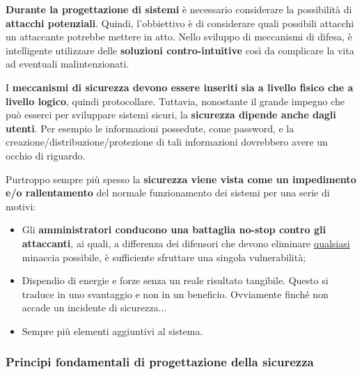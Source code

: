\documentclass[a4paper]{article}
\begin{document}
	\noindent
	\textbf{Durante la progettazione di sistemi} è necessario considerare la possibilità di \textbf{attacchi potenziali}. Quindi, l'obbiettivo è di considerare quali possibili attacchi un attaccante potrebbe mettere in atto. Nello sviluppo di meccanismi di difesa, è intelligente utilizzare delle \textbf{soluzioni contro-intuitive} così da complicare la vita ad eventuali malintenzionati.\newline
	
	\noindent
	I \textbf{meccanismi di sicurezza devono essere inseriti sia a livello fisico che a livello logico}, quindi protocollare. Tuttavia, nonostante il grande impegno che può esserci per sviluppare sistemi sicuri, la \textbf{sicurezza dipende anche dagli utenti}. Per esempio le informazioni possedute, come password, e la creazione/distribuzione/protezione di tali informazioni dovrebbero avere un occhio di riguardo.\newline
	
	\noindent
	Purtroppo sempre più spesso la \textbf{sicurezza viene vista come un impedimento e/o rallentamento} del normale funzionamento dei sistemi per una serie di motivi:
	\begin{itemize}
		\item Gli \textbf{amministratori conducono una battaglia no-stop contro gli attaccanti}, ai quali, a differenza dei difensori che devono eliminare \underline{qualsiasi} minaccia possibile, è sufficiente sfruttare una singola vulnerabilità;
		
		\item Dispendio di energie e forze senza un reale risultato tangibile. Questo si traduce in uno svantaggio e non in un beneficio. Ovviamente finché non accade un incidente di sicurezza...
		
		\item Sempre più elementi aggiuntivi al sistema.
	\end{itemize}\newpage
	
	\subsubsection{Principi fondamentali di progettazione della sicurezza}
	
\end{document}
